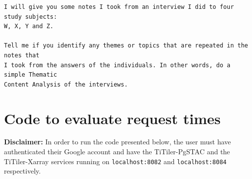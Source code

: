 \documentclass[
  oneside,
  open=any]{scrbook}
\begin{document}
\begin{verbatim}
I will give you some notes I took from an interview I did to four study subjects:
W, X, Y and Z.

Tell me if you identify any themes or topics that are repeated in the notes that 
I took from the answers of the individuals. In other words, do a simple Thematic
Content Analysis of the interviews.
\end{verbatim}

\section{Code to evaluate request times}\label{sec-request-code}

\textbf{Disclaimer:} In order to run the code presented below, the user
must have authenticated their Google account and have the TiTiler-PgSTAC
and the TiTiler-Xarray services running on \texttt{localhost:8082} and
\texttt{localhost:8084} respectively.
\end{document}
